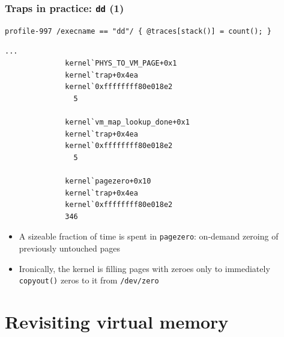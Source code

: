 \begin{frame}[fragile]
  \frametitle{Traps in practice: \texttt{dd} (1)}

  \begin{scriptsize}
\begin{verbatim}
profile-997 /execname == "dd"/ { @traces[stack()] = count(); }
\end{verbatim}
  \end{scriptsize}

  \pause

  \begin{scriptsize}
\begin{verbatim}
...
              kernel`PHYS_TO_VM_PAGE+0x1
              kernel`trap+0x4ea
              kernel`0xffffffff80e018e2
                5

              kernel`vm_map_lookup_done+0x1
              kernel`trap+0x4ea
              kernel`0xffffffff80e018e2
                5

              kernel`pagezero+0x10
              kernel`trap+0x4ea
              kernel`0xffffffff80e018e2
              346
\end{verbatim}
  \end{scriptsize}

  \pause

  \begin{itemize}
  \item A sizeable fraction of time is spent in \texttt{pagezero}: on-demand
    zeroing of previously untouched pages

  \item Ironically, the kernel is filling pages with zeroes only to
    immediately \texttt{copyout()} zeros to it from \texttt{/dev/zero}
  \end{itemize}

\end{frame}

\section{Revisiting virtual memory}

